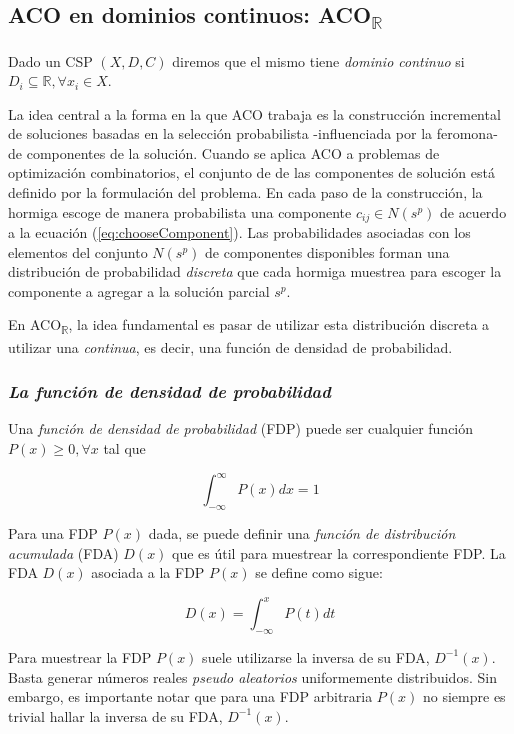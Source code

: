 \documentclass{llncs}
\begin{document}
	\subsection{ACO en dominios continuos: ACO\textsubscript{$\mathbb{R}$}}
	\label{subsec:acor}
	Dado un CSP $(X,D,C)$ diremos que el mismo tiene \textit{dominio continuo} si $D_i \subseteq \mathbb{R}, \forall x_i \in X$.
	
	La idea central a la forma en la que ACO trabaja es la construcción incremental de soluciones basadas en la selección probabilista -influenciada por la feromona- de componentes de la solución. Cuando se aplica ACO a problemas de optimización combinatorios, el conjunto de de las componentes de solución está definido por la formulación del problema. En cada paso de la construcción, la hormiga escoge de manera probabilista una componente $c_{ij} \in N(s^p)$ de acuerdo a la ecuación (\ref{eq:chooseComponent}). Las probabilidades asociadas con los elementos del conjunto $N(s^p)$ de componentes disponibles  forman una distribución de probabilidad \textit{discreta} que cada hormiga muestrea para escoger la componente a agregar a la solución parcial $s^p$.
	
	En ACO\textsubscript{$\mathbb{R}$}, la idea fundamental es pasar de utilizar esta distribución discreta a utilizar una \textit{continua}, es decir, una función de densidad de probabilidad.
	
	\subsubsection{\textit{La función de densidad de probabilidad}}
	Una \textit{función de densidad de probabilidad} (FDP) puede ser cualquier función $P(x) \geq 0, \forall x$ tal que
	
	\begin{equation*}
	\int_{-\infty}^{\infty}P(x)dx = 1
	\end{equation*}
	
	Para una FDP $P(x)$ dada, se puede definir una \textit{función de distribución acumulada} (FDA) $D(x)$ que es útil para muestrear la correspondiente FDP. La FDA $D(x)$ asociada a la FDP $P(x)$ se define como sigue:
	
	\begin{equation*}
	D(x) = \int_{-\infty}^{x}P(t)dt
	\end{equation*}
	
	Para muestrear la FDP $P(x)$ suele utilizarse la inversa de su FDA, $D^{-1}(x)$. Basta generar números reales \textit{pseudo aleatorios} uniformemente distribuidos. Sin embargo, es importante notar que para una FDP arbitraria $P(x)$ no siempre es trivial hallar la inversa de su FDA, $D^{-1}(x)$.
	
\end{document}

